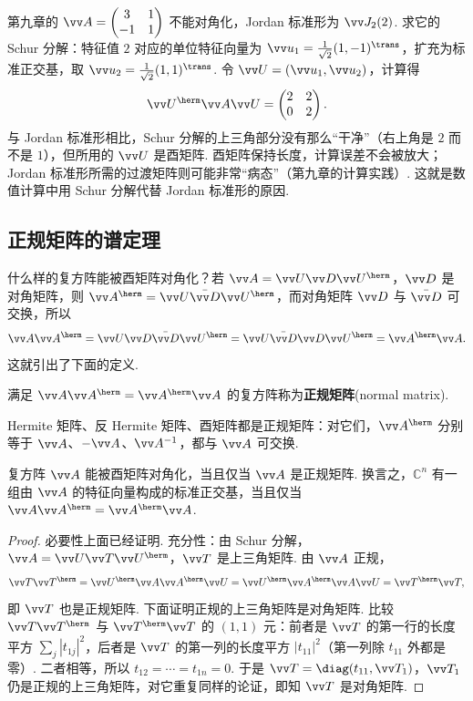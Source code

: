 	\begin{example}
		第九章的 $\vv A=\begin{pmatrix}3&1\\-1&1\end{pmatrix}$ 不能对角化，Jordan 标准形为 $\vv J_2(2)$. 求它的 Schur 分解：特征值 $2$ 对应的单位特征向量为 $\vv u_1=\frac1{\sqrt2}(1,-1)^\trans$，扩充为标准正交基，取 $\vv u_2=\frac1{\sqrt2}(1,1)^\trans$. 令 $\vv U=(\vv u_1,\vv u_2)$，计算得
		\[\vv U^\herm\vv A\vv U=\begin{pmatrix}2&2\\0&2\end{pmatrix}.\]
		与 Jordan 标准形相比，Schur 分解的上三角部分没有那么“干净”（右上角是 $2$ 而不是 $1$），但所用的 $\vv U$ 是酉矩阵. 酉矩阵保持长度，计算误差不会被放大；Jordan 标准形所需的过渡矩阵则可能非常“病态”（第九章的计算实践）. 这就是数值计算中用 Schur 分解代替 Jordan 标准形的原因.
	\end{example}
	
	\subsection{正规矩阵的谱定理}
	
	什么样的复方阵能被酉矩阵对角化？若 $\vv A=\vv U\vv D\vv U^\herm$，$\vv D$ 是对角矩阵，则 $\vv A^\herm=\vv U\bar{\vv D}\vv U^\herm$，而对角矩阵 $\vv D$ 与 $\bar{\vv D}$ 可交换，所以
	\[\vv A\vv A^\herm=\vv U\vv D\bar{\vv D}\vv U^\herm=\vv U\bar{\vv D}\vv D\vv U^\herm=\vv A^\herm\vv A.\]
	这就引出了下面的定义.
	
	\begin{definition}
		满足 $\vv A\vv A^\herm=\vv A^\herm\vv A$ 的复方阵称为\textbf{正规矩阵}(normal matrix).
	\end{definition}
	
	Hermite 矩阵、反 Hermite 矩阵、酉矩阵都是正规矩阵：对它们，$\vv A^\herm$ 分别等于 $\vv A$、$-\vv A$、$\vv A^{-1}$，都与 $\vv A$ 可交换.
	
	\begin{theorem}[正规矩阵的谱定理]\label{thm:normalspectral}
		复方阵 $\vv A$ 能被酉矩阵对角化，当且仅当 $\vv A$ 是正规矩阵. 换言之，$\mathbb{C}^n$ 有一组由 $\vv A$ 的特征向量构成的标准正交基，当且仅当 $\vv A\vv A^\herm=\vv A^\herm\vv A$.
	\end{theorem}
	\begin{proof}
		必要性上面已经证明. 充分性：由 Schur 分解，$\vv A=\vv U\vv T\vv U^\herm$，$\vv T$ 是上三角矩阵. 由 $\vv A$ 正规，
		\[\vv T\vv T^\herm=\vv U^\herm\vv A\vv A^\herm\vv U=\vv U^\herm\vv A^\herm\vv A\vv U=\vv T^\herm\vv T,\]
		即 $\vv T$ 也是正规矩阵. 下面证明正规的上三角矩阵是对角矩阵. 比较 $\vv T\vv T^\herm$ 与 $\vv T^\herm\vv T$ 的 $(1,1)$ 元：前者是 $\vv T$ 的第一行的长度平方 $\sum_{j}|t_{1j}|^2$，后者是 $\vv T$ 的第一列的长度平方 $|t_{11}|^2$（第一列除 $t_{11}$ 外都是零）. 二者相等，所以 $t_{12}=\cdots=t_{1n}=0$. 于是 $\vv T=\diag(t_{11},\vv T_1)$，$\vv T_1$ 仍是正规的上三角矩阵，对它重复同样的论证，即知 $\vv T$ 是对角矩阵.
	\end{proof}
	
